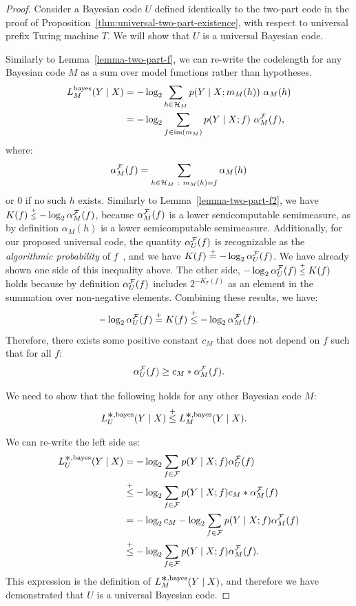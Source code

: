 \begin{proof}
Consider a Bayesian code $U$ defined identically to the two-part code in the proof of Proposition~\ref{thm:universal-two-part-existence}, with respect to universal prefix Turing machine $T$. We will show that $U$ is a universal Bayesian code.

Similarly to Lemma~\ref{lemma-two-part-f}, we can re-write the codelength for any Bayesian code $M$ as a sum over model functions rather than hypotheses.
\begin{align}
L^{\text{bayes}}_{M}(Y \mid X) &= -\log_2 \sum_{h \in {\mathcal{H}}_{M}} p(Y \mid X;m_{M}(h)) ~\alpha_{M}(h) \\
 &= -\log_2 \sum_{f \in \operatorname{im}(m_M)} p(Y \mid X;f) ~\alpha^{\mathcal{F}}_{M}(f),
\end{align}
where:
\begin{equation}
        \alpha^{\mathcal{F}}_M(f) = 
\sum_{h \in {\mathcal{H}}_M  ~:~ m_M(h) = f} \alpha_M(h)
\end{equation}
or $0$ if no such $h$ exists. 
Similarly to Lemma~\ref{lemma-two-part-f2}, we have $K(f) \leqc -\log_2 \alpha^\gF_M(f)$, because $\alpha^{\mathcal{F}}_M(f)$ is a lower semicomputable semimeasure, as by definition $\alpha_M(h)$ is a lower semicomputable semimeasure.
Additionally, for our proposed universal code, 
the quantity $\alpha^{\mathcal{F}}_U(f)$ is recognizable as the  \emph{algorithmic probability} of $f$~\citep{li2008introduction}, and we have $K(f) \stackrel{+}{=} -\log_2 \alpha^{\mathcal{F}}_U(f)$. We have already shown one side of this inequality above. The other side, $-\log_2 \alpha^\gF_U(f) \leqc K(f)$ holds because by definition $\alpha^{\mathcal{F}}_U(f)$ includes $2^{-K_T(f)}$ as an element in the summation over non-negative elements. Combining these results, we have:
\begin{equation}
    -\log_2 \alpha^\gF_U(f) \eqc K(f) \leqc -\log_2 \alpha^\gF_M(f).
\end{equation}
Therefore, there exists some positive constant $c_M$ that does not depend on $f$ such that for all $f$:
\begin{equation}
    \alpha^{\mathcal{F}}_U(f) \geq c_M * \alpha^{\mathcal{F}}_M(f).
\end{equation}

We need to show that the following holds for any other Bayesian code $M$:
\begin{align}
L^{\bigast,\text{bayes}}_U(Y \mid X) &\leqc L^{\bigast,\text{bayes}}_M(Y \mid X).
\end{align}


We can re-write the left side as:
\begin{align}
L^{\bigast,\text{bayes}}_U(Y \mid X) &= -\log_2 \sum_{f \in \gF} p(Y \mid X;f) \alpha^\gF_U(f) \\
        &\leqc -\log_2 \sum_{f \in \gF} p(Y \mid X;f) c_M * \alpha^\gF_M(f) \\
        &= -\log_2 c_M - \log_2 \sum_{f \in \gF} p(Y \mid X;f) \alpha^\gF_M(f) \\
        &\leqc -\log_2 \sum_{f \in \gF} p(Y \mid X;f) \alpha^\gF_M(f).
\end{align}
This expression is the definition of $L^{\bigast,\text{bayes}}_M(Y \mid X)$, and therefore we have demonstrated that $U$ is a universal Bayesian code.
\end{proof}


